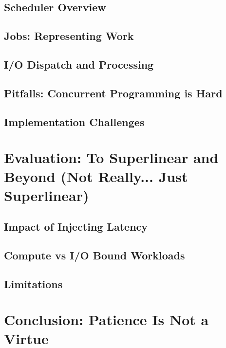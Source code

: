 \documentclass[bsc,frontabs,singlespacing,parskip,deptreport,normalheadings]{infthesis}
\begin{document}
\section{Scheduler Overview}

\section{Jobs: Representing Work}

\section{I/O Dispatch and Processing}
\label{section:i/o_dispatch_and_processing}

\section{Pitfalls: Concurrent Programming is Hard}

\section{Implementation Challenges}


\chapter{Evaluation: To Superlinear and Beyond (Not Really... Just Superlinear)}

\section{Impact of Injecting Latency}

\section{Compute vs I/O Bound Workloads}

\section{Limitations}


\chapter{Conclusion: Patience Is Not a Virtue}
\end{document}
